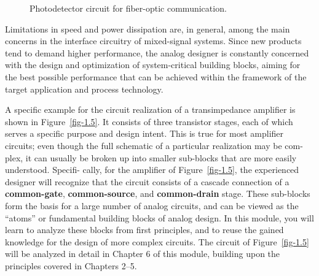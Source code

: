 \documentclass[
  11pt,
  letterpaper,
  abstract]{scrbook}
\begin{document}
\begin{figure}


\caption{\label{fig-1.4}Photodetector circuit for fiber-optic
communication.}

\end{figure}%

Limitations in speed and power dissipation are, in general, among the
main concerns in the interface circuitry of mixed-signal systems. Since
new products tend to demand higher performance, the analog designer is
constantly concerned with the design and optimization of system-critical
building blocks, aiming for the best possible performance that can be
achieved within the framework of the target application and process
technology.

A specific example for the circuit realization of a transimpedance
amplifier is shown in Figure~\ref{fig-1.5}. It consists of three
transistor stages, each of which serves a specific purpose and design
intent. This is true for most amplifier circuits; even though the full
schematic of a particular realization may be com- plex, it can usually
be broken up into smaller sub-blocks that are more easily understood.
Specifi- cally, for the amplifier of Figure~\ref{fig-1.5}, the
experienced designer will recognize that the circuit consists of a
cascade connection of a \textbf{common-gate}, \textbf{common-source},
and \textbf{common-drain} stage. These sub-blocks form the basis for a
large number of analog circuits, and can be viewed as the ``atoms'' or
fundamental building blocks of analog design. In this module, you will
learn to analyze these blocks from first principles, and to reuse the
gained knowledge for the design of more complex circuits. The circuit of
Figure~\ref{fig-1.5} will be analyzed in detail in Chapter 6 of this
module, building upon the principles covered in Chapters 2--5.
\end{document}
